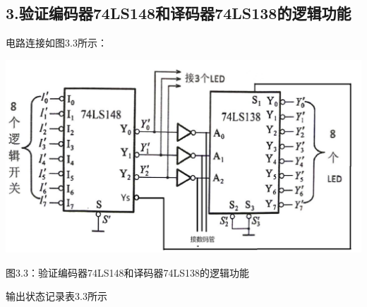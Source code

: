\documentclass{ctexart}
\begin{document}
\subsection*{3.验证编码器74LS148和译码器74LS138的逻辑功能}
电路连接如图3.3所示：

    \begin{minipage}[l]{\textwidth}
        \centering 
        \includegraphics[width=\linewidth]{3.3.png} 
        
        图3.3：验证编码器74LS148和译码器74LS138的逻辑功能
    \end{minipage}

输出状态记录表3.3所示
\end{document}

